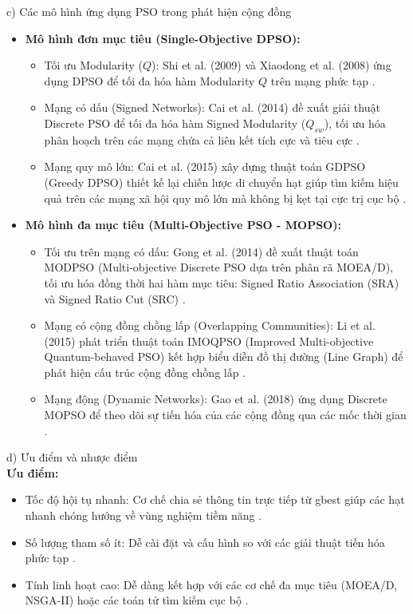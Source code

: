 \documentclass[14pt,a4paper]{extarticle}
\begin{document}
\noindent c) Các mô hình ứng dụng PSO trong phát hiện cộng đồng
\begin{itemize}
    \item \textbf{Mô hình đơn mục tiêu (Single-Objective DPSO):}
    \begin{itemize}
        \item Tối ưu Modularity ($Q$): Shi et al. (2009) và Xiaodong et al. (2008) ứng dụng DPSO để tối đa hóa hàm Modularity $Q$ trên mạng phức tạp \cite{Baraa2021, Gong2016}.
        \item Mạng có dấu (Signed Networks): Cai et al. (2014) đề xuất giải thuật Discrete PSO để tối đa hóa hàm Signed Modularity ($Q_{sw}$), tối ưu hóa phân hoạch trên các mạng chứa cả liên kết tích cực và tiêu cực \cite{Baraa2021, Gong2016}.
        \item Mạng quy mô lớn: Cai et al. (2015) xây dựng thuật toán GDPSO (Greedy DPSO) thiết kế lại chiến lược di chuyển hạt giúp tìm kiếm hiệu quả trên các mạng xã hội quy mô lớn mà không bị kẹt tại cực trị cục bộ \cite{Baraa2021, Beldi2025}.
    \end{itemize}
    \item \textbf{Mô hình đa mục tiêu (Multi-Objective PSO - MOPSO):}
    \begin{itemize}
        \item Tối ưu trên mạng có dấu: Gong et al. (2014) đề xuất thuật toán MODPSO (Multi-objective Discrete PSO dựa trên phân rã MOEA/D), tối ưu hóa đồng thời hai hàm mục tiêu: Signed Ratio Association (SRA) và Signed Ratio Cut (SRC) \cite{Baraa2021}.
        \item Mạng có cộng đồng chồng lấp (Overlapping Communities): Li et al. (2015) phát triển thuật toán IMOQPSO (Improved Multi-objective Quantum-behaved PSO) kết hợp biểu diễn đồ thị đường (Line Graph) để phát hiện cấu trúc cộng đồng chồng lấp \cite{Baraa2021}.
        \item Mạng động (Dynamic Networks): Gao et al. (2018) ứng dụng Discrete MOPSO để theo dõi sự tiến hóa của các cộng đồng qua các mốc thời gian \cite{Baraa2021}.
    \end{itemize}
\end{itemize}

\noindent d) Ưu điểm và nhược điểm
\\
\textbf{Ưu điểm:}

    \begin{itemize}
        \item Tốc độ hội tụ nhanh: Cơ chế chia sẻ thông tin trực tiếp từ gbest giúp các hạt nhanh chóng hướng về vùng nghiệm tiềm năng \cite{Baraa2021, Beldi2025}.
        \item Số lượng tham số ít: Dễ cài đặt và cấu hình so với các giải thuật tiến hóa phức tạp \cite{Baraa2021}.
        \item Tính linh hoạt cao: Dễ dàng kết hợp với các cơ chế đa mục tiêu (MOEA/D, NSGA-II) hoặc các toán tử tìm kiếm cục bộ \cite{Baraa2021}.
    \end{itemize}
\end{document}
